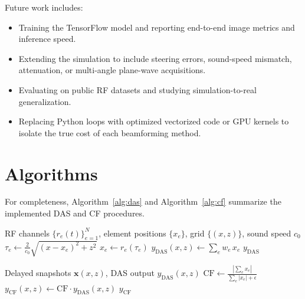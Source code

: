 \documentclass[conference]{IEEEtran}
\begin{document}
Future work includes:
\begin{itemize}
    \item Training the TensorFlow model and reporting end-to-end image metrics and inference speed.
    \item Extending the simulation to include steering errors, sound-speed mismatch, attenuation, or multi-angle plane-wave acquisitions.
    \item Evaluating on public RF datasets and studying simulation-to-real generalization.
    \item Replacing Python loops with optimized vectorized code or GPU kernels to isolate the true cost of each beamforming method.
\end{itemize}

\appendices
\section{Algorithms}
For completeness, Algorithm~\ref{alg:das} and Algorithm~\ref{alg:cf} summarize the implemented DAS and CF procedures.

\begin{algorithm}[t]
\caption{Delay-and-sum beamforming (DAS)}
\label{alg:das}
\begin{algorithmic}[1]
\REQUIRE RF channels $\{r_e(t)\}_{e=1}^N$, element positions $\{x_e\}$, grid $\{(x,z)\}$, sound speed $c_0$
        \STATE $\tau_e \leftarrow \frac{2}{c_0}\sqrt{(x-x_e)^2+z^2}$
        \STATE $x_e \leftarrow r_e(\tau_e)$ 
    \ENDFOR
    \STATE $y_{\mathrm{DAS}}(x,z) \leftarrow \sum_e w_e\, x_e$
\ENDFOR
\RETURN $y_{\mathrm{DAS}}$
\end{algorithmic}
\end{algorithm}

\begin{algorithm}[t]
\caption{Coherence-factor weighting (CF)}
\label{alg:cf}
\begin{algorithmic}[1]
\REQUIRE Delayed snapshots $\mathbf{x}(x,z)$, DAS output $y_{\mathrm{DAS}}(x,z)$
    \STATE $\mathrm{CF} \leftarrow \frac{|\sum_e x_e|}{\sum_e |x_e| + \epsilon}$
    \STATE $y_{\mathrm{CF}}(x,z) \leftarrow \mathrm{CF}\cdot y_{\mathrm{DAS}}(x,z)$
\ENDFOR
\RETURN $y_{\mathrm{CF}}$
\end{algorithmic}
\end{algorithm}
\end{document}
